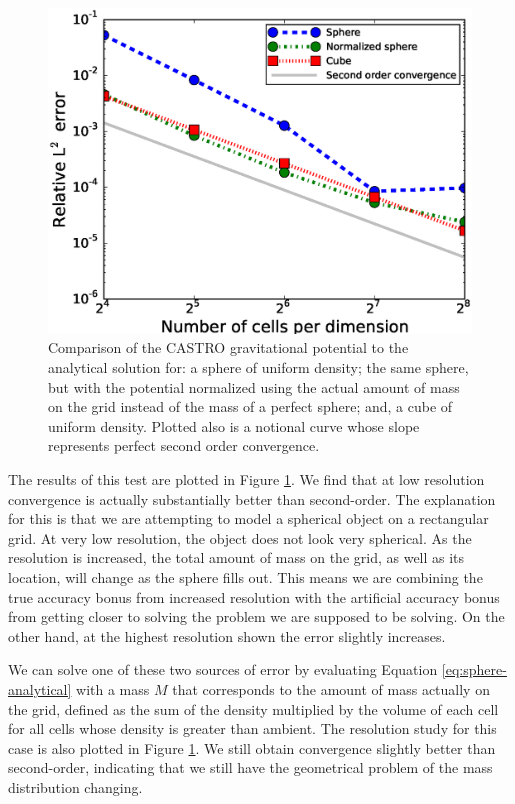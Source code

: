 \documentclass[iop]{emulateapj}
\begin{document}
\begin{figure}
  \centering
  \includegraphics[scale=0.45]{plots/phi_comparison}
  \caption{Comparison of the CASTRO gravitational potential to the analytical solution for: 
    a sphere of uniform density; the same sphere, but with the potential normalized using the 
    actual amount of mass on the grid instead of the mass of a perfect sphere; and, a 
    cube of uniform density. Plotted also is a notional curve whose slope represents
    perfect second order convergence.\label{fig:gravity_convergence}}
\end{figure}

The results of this test are plotted in Figure
\ref{fig:gravity_convergence}. We find that at low resolution 
convergence is actually substantially better than second-order. The 
explanation for this is that we are attempting to model a spherical 
object on a rectangular grid. At very low resolution, the object does 
not look very spherical. As the resolution is increased, the total 
amount of mass on the grid, as well as its location, will change 
as the sphere fills out. This means we are combining the true accuracy 
bonus from increased resolution with the artificial accuracy bonus 
from getting closer to solving the problem we are supposed to be solving. 
On the other hand, at the highest resolution shown the error slightly increases.

We can solve one of these two sources of error by evaluating Equation
\ref{eq:sphere-analytical} with a mass $M$ that corresponds to the
amount of mass actually on the grid, defined as the sum of the density
multiplied by the volume of each cell for all cells whose density is 
greater than ambient. The resolution study for this case is also
plotted in Figure \ref{fig:gravity_convergence}. We still obtain
convergence slightly better than second-order, indicating that we 
still have the geometrical problem of the mass distribution changing.
\end{document}
